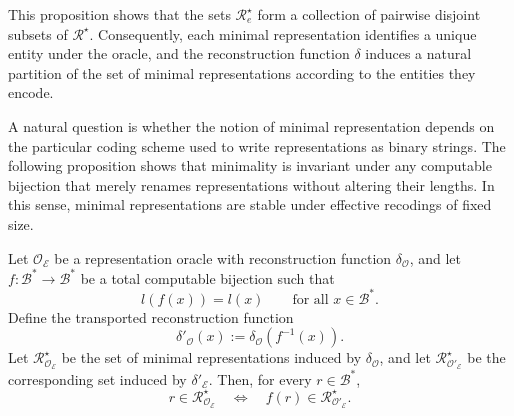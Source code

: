 This proposition shows that the sets $\mathcal{R}^\star_{e}$ form a collection of pairwise disjoint subsets of $\mathcal{R}^\star$. Consequently, each minimal representation identifies a unique entity under the oracle, and the reconstruction function $\delta$ induces a natural partition of the set of minimal representations according to the entities they encode.

A natural question is whether the notion of minimal representation depends on the particular coding scheme used to write representations as binary strings. The following proposition shows that minimality is invariant under any computable bijection that merely renames representations without altering their lengths. In this sense, minimal representations are stable under effective recodings of fixed size.

\begin{proposition}
Let $\mathcal{O}_{\mathcal{E}}$ be a representation oracle with reconstruction function $\delta_{\mathcal{O}}$, and let $f:\mathcal{B}^\ast \to \mathcal{B}^\ast$ be a total computable bijection such
that
\[
l(f(x)) = l(x)
\qquad
\text{for all } x \in \mathcal{B}^\ast.
\]
Define the transported reconstruction function
\[
\delta'_{\mathcal{O}}(x) := \delta_{\mathcal{O}}(f^{-1}(x)).
\]
Let $\mathcal{R}^\star_{\mathcal{O}_{\mathcal{E}}}$ be the set of minimal representations induced by $\delta_{\mathcal{O}}$, and let $\mathcal{R}^\star_{\mathcal{O}'_{\mathcal{E}}}$ be the corresponding set induced by $\delta'_{\mathcal{E}}$. Then, for every $r \in \mathcal{B}^\ast$,
\[
r \in \mathcal{R}^\star_{\mathcal{O}_{\mathcal{E}}}
\quad\Longleftrightarrow\quad
f(r) \in \mathcal{R}^\star_{\mathcal{O}'_{\mathcal{E}}}.
\]
\end{proposition}
